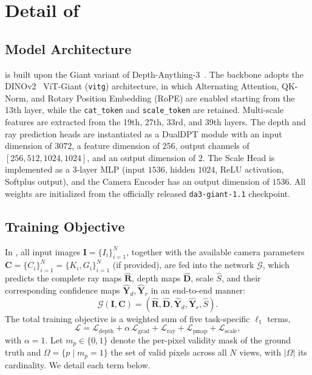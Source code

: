 \section{Detail of \ours}
\label{appendix:dan}
\subsection{Model Architecture}
\ours is built upon the Giant variant of Depth-Anything-3~\citep{lin2025depth}.
%
The backbone adopts the DINOv2~\citep{oquab2023dinov2} ViT-Giant (\texttt{vitg}) architecture, in which Alternating Attention, QK-Norm, and Rotary Position Embedding (RoPE) are enabled starting from the 13th layer, while the \texttt{cat\_token} and \texttt{scale\_token} are retained. 
%
Multi-scale features are extracted from the 19th, 27th, 33rd, and 39th layers. 
%
The depth and ray prediction heads are instantiated as a DualDPT module with an input dimension of $3072$, a feature dimension of $256$, output channels of $[256, 512, 1024, 1024]$, and an output dimension of $2$.
%
The Scale Head is implemented as a 3-layer MLP (input $1536$, hidden $1024$, ReLU activation, Softplus output), and the Camera Encoder has an output dimension of $1536$. 
%
All weights are initialized from the officially released \texttt{da3-giant-1.1} checkpoint.

\subsection{Training Objective}
In \ours, all input images $\mathbf{I} = \{I_i\}^N_{i=1}$, together with the available camera parameters $\mathbf{C} = \{C_i\}^N_{i=1}=\{K_i,G_i\}^N_{i=1}$ (if provided), are fed into the network $\mathcal{G}$, which predicts the complete ray maps $\hat{\mathbf{R}}$, depth maps $\hat{\mathbf{D}}$, scale $\hat{S}$, and their corresponding confidence maps $\hat{\mathbf{Y}}_d, \hat{\mathbf{Y}}_r$ in an end-to-end manner:
\begin{equation}
\mathcal{G}\left(\mathbf{I},\mathbf{C}\right)=(\hat{\mathbf{R}},\hat{\mathbf{D}}, \hat{\mathbf{Y}}_d,\hat{\mathbf{Y}}_r,\hat{S}).
\end{equation}
%
The total training objective is a weighted sum of five task-specific $\ell_1$ terms,
\begin{equation}
\mathcal{L} = \mathcal{L}_{\text{depth}} + \alpha\,\mathcal{L}_{\text{grad}} + \mathcal{L}_{\text{ray}} + \mathcal{L}_{\text{pmap}} + \mathcal{L}_{\text{scale}},
\label{eq:total_loss}
\end{equation}
with $\alpha=1$.
%
Let $m_p\!\in\!\{0,1\}$ denote the per-pixel validity mask of the ground truth and $\Omega=\{p\mid m_p=1\}$ the set of valid pixels across all $N$ views, with $|\Omega|$ its cardinality. We detail each term below.

